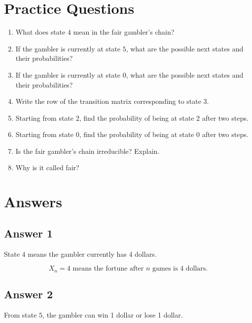 \documentclass[12pt,a4paper]{article}
\theoremstyle{notestyle}
\begin{document}
\section{Practice Questions}

\begin{enumerate}[label=\textbf{Q\arabic*.}, leftmargin=1.2cm]
    \item What does state $4$ mean in the fair gambler's chain?

    \item If the gambler is currently at state $5$, what are the possible next states and their probabilities?

    \item If the gambler is currently at state $0$, what are the possible next states and their probabilities?

    \item Write the row of the transition matrix corresponding to state $3$.

    \item Starting from state $2$, find the probability of being at state $2$ after two steps.

    \item Starting from state $0$, find the probability of being at state $0$ after two steps.

    \item Is the fair gambler's chain irreducible? Explain.

    \item Why is it called fair?
\end{enumerate}

\section{Answers}

\subsection*{Answer 1}

State $4$ means the gambler currently has 4 dollars.

\[
\boxed{X_n=4\text{ means the fortune after }n\text{ games is 4 dollars.}}
\]

\subsection*{Answer 2}

From state $5$, the gambler can win 1 dollar or lose 1 dollar.
\end{document}
